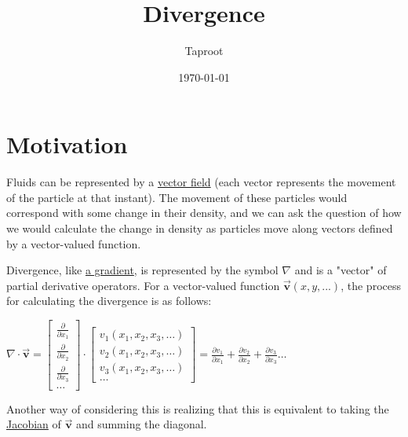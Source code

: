 \documentclass[letterpaper]{article}
\author{Taproot}
\date{\today}
\title{Divergence}
\renewcommand{\tableofcontents}{}
\begin{document}
\tableofcontents


\section{Motivation}
\label{sec:org3b82556}
Fluids can be represented by a \href{20200831153854-vector\_field.org}{vector field} (each vector represents the movement of the particle at that instant). The movement of these particles would correspond with some change in their density, and we can ask the question of how we would calculate the change in density as particles move along vectors defined by a vector-valued function.

Divergence, like \href{20200830000157-gradients.org}{a gradient}, is represented by the symbol \(\nabla\) and is a "vector" of partial derivative operators. For a vector-valued function \(\vec{\mathbf{v}}(x,y,...)\), the process for calculating the divergence is as follows:

\(\nabla \cdot \vec{\mathbf{v}} = \left[\begin{matrix} \frac{\partial}{\partial x_1} \\ \frac{\partial}{\partial x_2} \\ \frac{\partial}{\partial x_3} \\ \ldots \end{matrix}\right] \cdot \left[\begin{matrix} v_1(x_1, x_2, x_3, \ldots) \\ v_2(x_1, x_2, x_3, \ldots) \\ v_3(x_1, x_2, x_3, \ldots) \\ \ldots\end{matrix}\right] = \frac{\partial v_1}{\partial x_1} + \frac{\partial v_2}{\partial x_2} + \frac{\partial v_3}{\partial x_3} \ldots\)

Another way of considering this is realizing that this is equivalent to taking the \href{20200830000754-jacobian.org}{Jacobian} of \(\vec{\mathbf{v}}\) and summing the diagonal.
\end{document}
